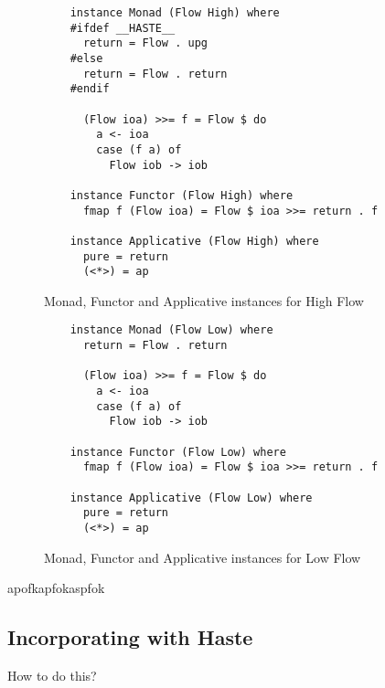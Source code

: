 \begin{figure}[h]
  \lstset{language=Haskell}
  \begin{lstlisting}
    instance Monad (Flow High) where
    #ifdef __HASTE__
      return = Flow . upg
    #else
      return = Flow . return
    #endif

      (Flow ioa) >>= f = Flow $ do
        a <- ioa
        case (f a) of
          Flow iob -> iob

    instance Functor (Flow High) where
      fmap f (Flow ioa) = Flow $ ioa >>= return . f

    instance Applicative (Flow High) where
      pure = return
      (<*>) = ap
  \end{lstlisting}
  \caption{Monad, Functor and Applicative instances for High Flow}
  \label{fig:high_instances}
\end{figure}
\begin{figure}[h]
  \lstset{language=Haskell}
  \begin{lstlisting}
    instance Monad (Flow Low) where
      return = Flow . return

      (Flow ioa) >>= f = Flow $ do
        a <- ioa
        case (f a) of
          Flow iob -> iob

    instance Functor (Flow Low) where
      fmap f (Flow ioa) = Flow $ ioa >>= return . f

    instance Applicative (Flow Low) where
      pure = return
      (<*>) = ap
  \end{lstlisting}
  \caption{Monad, Functor and Applicative instances for Low Flow}
  \label{fig:low_instances}
\end{figure}
apofkapfokaspfok
\subsection{Incorporating with Haste}
How to do this?
